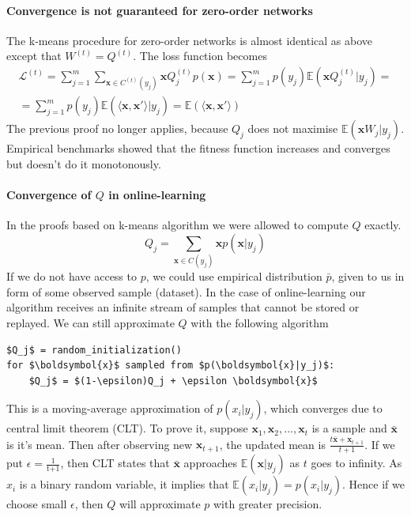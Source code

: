 \documentclass[12pt]{article}
\begin{document}
\paragraph{Convergence is not guaranteed for zero-order networks}
The k-means procedure for zero-order networks is almost identical as above except that $W^{(t)}=Q^{(t)}$. The loss function becomes
\begin{gather*}
\mathcal{L}^{(t)} = \sum_{j=1}^m \sum_{\boldsymbol{x}\in C^{(t)}(y_j)} \boldsymbol{x} Q_j^{(t)} p(\boldsymbol{x}) = \sum_{j=1}^m p(y_j) \mathbb{E}(\boldsymbol{x} Q_j^{(t)}|y_j) = \\ 
= \sum_{j=1}^m p(y_j) \mathbb{E}(\langle \boldsymbol{x},\boldsymbol{x}' \rangle |y_j) 	 = \mathbb{E}(\langle \boldsymbol{x},\boldsymbol{x}' \rangle)
\end{gather*}
The previous proof no longer applies, because $Q_j$ does not maximise $\mathbb{E}(\boldsymbol{x}W_j|y_j)$. Empirical benchmarks showed that the fitness function increases and converges but doesn't do it monotonously. 
\paragraph{Convergence of $Q$ in online-learning}
In the proofs based on k-means algorithm we were allowed to compute $Q$ exactly. 
\[
Q_j = \sum_{\boldsymbol{x}\in C(y_j)}\boldsymbol{x}p(\boldsymbol{x}|y_j)
\]
If we do not have access to $p$, we could use empirical distribution $\bar{p}$, given to us in form of some observed sample (dataset). In the case of online-learning our algorithm receives an infinite stream of samples that cannot be stored or replayed. We can still approximate $Q$ with the following algorithm
\begin{lstlisting}
$Q_j$ = random_initialization()
for $\boldsymbol{x}$ sampled from $p(\boldsymbol{x}|y_j)$:
    $Q_j$ = $(1-\epsilon)Q_j + \epsilon \boldsymbol{x}$ 
\end{lstlisting}
This is a moving-average approximation of $p(x_i|y_j)$, which converges due to central limit theorem (CLT). To prove it, suppose $\boldsymbol{x}_1,\boldsymbol{x}_2,...,\boldsymbol{x}_t$ is a sample and $\bar{\boldsymbol{x}}$ is it's mean. Then after observing new $\boldsymbol{x}_{t+1}$, the updated mean is $\frac{t\bar{\boldsymbol{x}} + \boldsymbol{x}_{t+1} }{t+1}$. If we put $\epsilon=\frac{1}{\text{t+1}}$, then CLT states that $\bar{\boldsymbol{x}}$ approaches $\mathbb{E}(\boldsymbol{x}|y_j)$ as $t$ goes to infinity. As $x_i$ is a binary random variable, it implies that $\mathbb{E}(x_i|y_j)=p(x_i|y_j)$. Hence if we choose small $\epsilon$, then $Q$ will approximate $p$ with greater precision.
\end{document}
